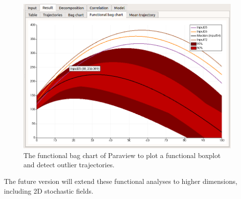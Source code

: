 \documentclass{article}
\begin{document}
\begin{figure}
\centering
\includegraphics[width=\textwidth]{figures/functional_bag_chart-focus.png}
\caption{The functional bag chart of Paraview to plot a functional boxplot and detect outlier trajectories.}
\label{fig-functionnalbagchart}
\end{figure}

The future version will extend these functional analyses to higher dimensions, including 2D stochastic fields. 






\end{document}
